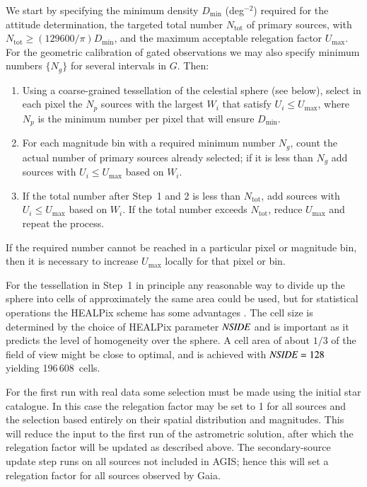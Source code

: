 \documentclass[structabstract]{aa}
\begin{document}
We start by specifying the minimum density $D_\text{min}$ (deg$^{-2}$) 
required for the attitude determination, the targeted total number 
$N_\text{tot}$ of primary sources, with $N_\text{tot}\ge (129600/\pi)D_\text{min}$,
and the maximum acceptable relegation factor $U_\text{max}$. For the 
geometric calibration of gated observations we may also specify 
minimum numbers $\{N_g\}$ for several intervals in $G$. Then:
\begin{enumerate}
\item 
Using a coarse-grained tessellation of the celestial sphere (see below),
select in each pixel the $N_p$ sources with the largest $W_i$ that satisfy 
$U_i\le U_\text{max}$, where $N_p$ is the minimum number per pixel
that will ensure $D_\text{min}$.
\item
For each magnitude bin with a required minimum number $N_g$, count
the actual number of primary sources already selected; if it is less than 
$N_g$ add sources with $U_i\le U_\text{max}$ based on $W_i$.
\item
If the total number after Step~1 and 2 is less than $N_\text{tot}$, 
add sources with $U_i\le U_\text{max}$ based on $W_i$. If the total 
number exceeds $N_\text{tot}$, reduce $U_\text{max}$ and repeat 
the process.
\end{enumerate}
If the required number cannot be reached in a particular pixel or 
magnitude bin, then it is necessary to increase $U_\text{max}$ 
locally for that pixel or bin.

For the tessellation in Step~1 in principle any reasonable way to divide up
the sphere into cells of approximately the same area could be used, but 
for statistical operations the HEALPix scheme \citep{gor05} has some advantages 
\citep{omu01}. The cell size is determined by the choice of HEALPix parameter
$\text{\it NSIDE}$ and is important as it predicts the level of homogeneity over 
the sphere. A cell area of about $1/3$ of the field of view might be close
to optimal, and is achieved with $\text{\it NSIDE}=128$ yielding 196\,608~cells.

For the first run with real data some selection must be made using the initial 
star catalogue. In this case the relegation factor may be set to 1 for all
sources and the selection based entirely on their spatial distribution 
and magnitudes. This will reduce the input to the first run of the astrometric 
solution, after which the relegation factor will be updated as described above. 
The secondary-source update step runs on 
all sources not included in AGIS; hence this will set a relegation factor 
for all sources observed by Gaia.
\end{document}
